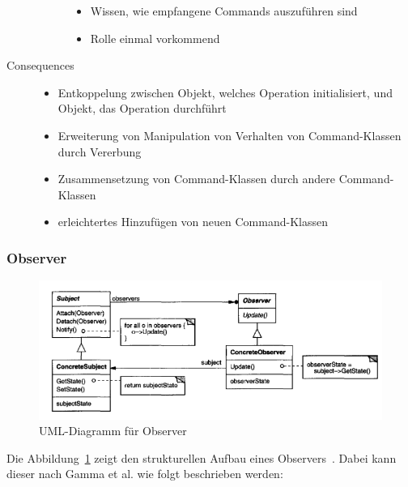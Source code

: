 \begin{description}
\begin{description}
\begin{itemize}
            \item Wissen, wie empfangene Commands auszuführen sind
            \item Rolle einmal vorkommend  
        \end{itemize}
    \end{description}
    \item[Consequences] \hfill
    \begin{itemize}
        \item Entkoppelung zwischen Objekt, welches Operation initialisiert, und Objekt, das Operation durchführt
        \item Erweiterung von Manipulation von Verhalten von Command-Klassen durch Vererbung
        \item Zusammensetzung von Command-Klassen durch andere Command-Klassen
        \item erleichtertes Hinzufügen von neuen Command-Klassen
    \end{itemize}
\end{description}

\subsubsection{Observer}

\begin{figure}[h]
    \centering
    \includegraphics[scale=0.75]{figures/observer.png}
    \caption{UML-Diagramm für Observer}
    \label{fig:observer}
\end{figure}

Die Abbildung~\ref{fig:observer} zeigt den strukturellen Aufbau eines Observers~\cite[S. 293]{gamma1994design}.
Dabei kann dieser nach Gamma et al. wie folgt beschrieben werden:

